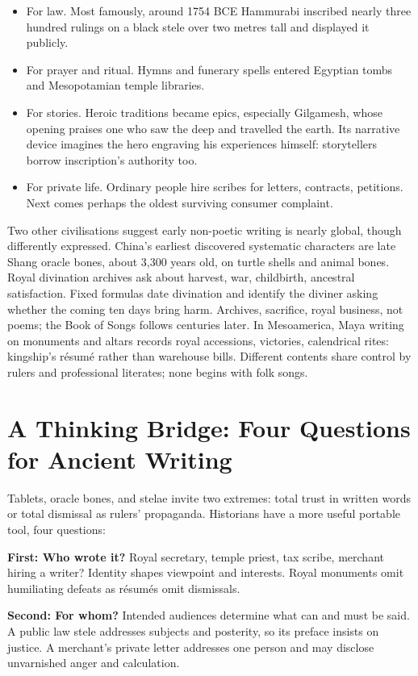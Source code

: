 \begin{itemize}
\item For law. Most famously, around 1754 BCE Hammurabi inscribed nearly three hundred rulings on a black stele over two metres tall and displayed it publicly.
\item For prayer and ritual. Hymns and funerary spells entered Egyptian tombs and Mesopotamian temple libraries.
\item For stories. Heroic traditions became epics, especially Gilgamesh, whose opening praises one who saw the deep and travelled the earth. Its narrative device imagines the hero engraving his experiences himself: storytellers borrow inscription's authority too.
\item For private life. Ordinary people hire scribes for letters, contracts, petitions. Next comes perhaps the oldest surviving consumer complaint.
\end{itemize}
Two other civilisations suggest early non-poetic writing is nearly global, though differently expressed. China's earliest discovered systematic characters are late Shang oracle bones, about 3,300 years old, on turtle shells and animal bones. Royal divination archives ask about harvest, war, childbirth, ancestral satisfaction. Fixed formulas date divination and identify the diviner asking whether the coming ten days bring harm. Archives, sacrifice, royal business, not poems; the Book of Songs follows centuries later. In Mesoamerica, Maya writing on monuments and altars records royal accessions, victories, calendrical rites: kingship's résumé rather than warehouse bills. Different contents share control by rulers and professional literates; none begins with folk songs.

\section[Thinking Bridge: Four Source Questions]{A Thinking Bridge: Four Questions for Ancient Writing}
Tablets, oracle bones, and stelae invite two extremes: total trust in written words or total dismissal as rulers' propaganda. Historians have a more useful portable tool, four questions:

\textbf{First: Who wrote it?} Royal secretary, temple priest, tax scribe, merchant hiring a writer? Identity shapes viewpoint and interests. Royal monuments omit humiliating defeats as résumés omit dismissals.

\textbf{Second: For whom?} Intended audiences determine what can and must be said. A public law stele addresses subjects and posterity, so its preface insists on justice. A merchant's private letter addresses one person and may disclose unvarnished anger and calculation.

